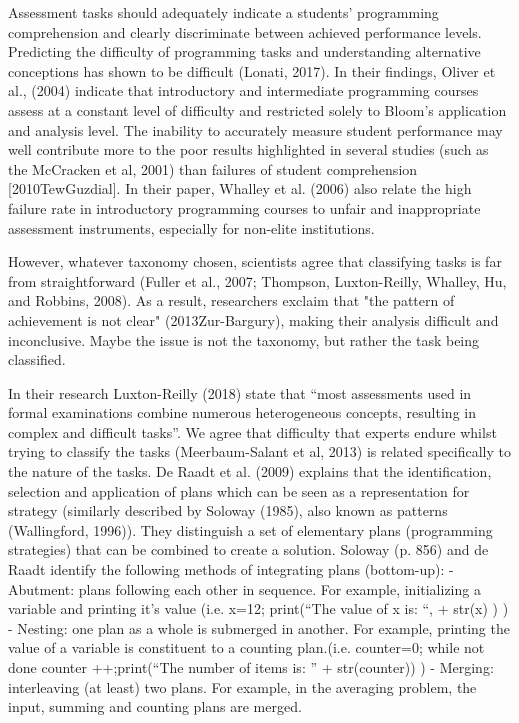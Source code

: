 Assessment tasks should adequately indicate a students’ programming comprehension and clearly discriminate between achieved performance levels. Predicting the difficulty of programming tasks and understanding alternative conceptions has shown to be difficult (Lonati, 2017). In their findings, Oliver et al., (2004) indicate that introductory and intermediate programming courses assess at a constant level of difficulty and restricted solely to Bloom’s application and analysis level. The inability to accurately measure student performance may well contribute more to the poor results highlighted in several studies (such as the McCracken et al, 2001) than failures of student comprehension [2010TewGuzdial].  In their paper, Whalley et al. (2006) also relate the high failure rate in introductory programming courses to unfair and inappropriate assessment instruments, especially for non-elite institutions.




However, whatever taxonomy chosen, scientists agree that classifying tasks is far from straightforward (Fuller et al., 2007; Thompson, Luxton-Reilly, Whalley, Hu, and Robbins, 2008). As a result, researchers exclaim that "the pattern of achievement is not clear" (2013Zur-Bargury), making their analysis difficult and inconclusive. Maybe the issue is not the taxonomy, but rather the task being classified.

In their research Luxton-Reilly (2018) state that “most assessments used in formal examinations combine numerous heterogeneous concepts, resulting in complex and difficult tasks”. We agree that difficulty that experts endure whilst trying to classify the tasks (Meerbaum-Salant et al, 2013) is related specifically to the nature of the tasks. De Raadt et al. (2009) explains that the identification, selection and application of plans which can be seen as a representation for strategy (similarly described by Soloway (1985), also known as patterns (Wallingford, 1996)). They distinguish a set of elementary plans (programming strategies) that can be combined to create a solution. Soloway (p. 856) and de Raadt identify the following methods of integrating plans (bottom-up):
-	Abutment: plans following each other in sequence. For example, initializing a variable and printing it’s value (i.e. x=12; print(“The value of x is: “, + str(x) ) )
-	Nesting: one plan as a whole is submerged in another. For example, printing the value of a variable is constituent to a counting plan.(i.e. counter=0; while not done counter ++;print(“The number of items is: ” + str(counter)) )
-	Merging: interleaving (at least) two plans. For example, in the averaging problem, the input, summing and counting plans are merged.


